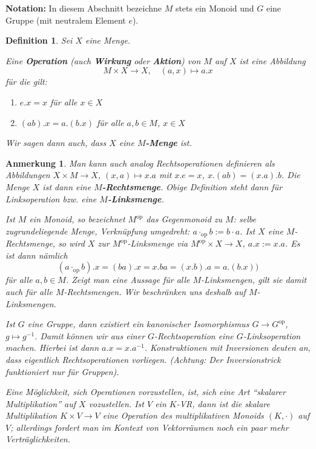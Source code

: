 \documentclass[a4paper, twoside, 11pt, ngerman]{report}
\theoremstyle{definistyle}
\newtheorem{defini}[satz]{Definition}
\newtheorem{anm}[satz]{Anmerkung}
\theoremstyle{remark}
\newcommand{\defn}[1]{\textit{\bfseries #1}}
\begin{document}
\textbf{Notation:} In diesem Abschnitt bezeichne $M$ stets ein Monoid und $G$ eine Gruppe (mit neutralem Element $e$).

\begin{defini}\label{def:operation}
Sei $X$ eine Menge.

Eine \defn{Operation} (auch \defn{Wirkung} oder \defn{Aktion}) von $M$ auf $X$ ist eine Abbildung
\[
M \times X \to X, \quad (a, x) \mapsto a . x
\]
für die gilt:
\begin{enumerate}[label=(O\arabic*)]
    \item $e . x = x$ für alle $x \in X$
    \item $(a b) . x = a . (b . x)$ für alle $a, b \in M$, $x \in X$
\end{enumerate}

Wir sagen dann auch, dass $X$ eine \defn{$M$-Menge} ist.
\end{defini}

\begin{anm}\label{anm:rechtsoperation}
Man kann auch analog \glqq Rechtsoperationen\grqq{} definieren als Abbildungen $X \times M \to X$, $(x, a) \mapsto x . a$ mit $x . e = x$, $x . (a  b) = (x . a) . b $. Die Menge $X$ ist dann eine \defn{$M$-Rechtsmenge}.
Obige Definition steht dann für \glqq Linksoperation\grqq{} bzw. eine \defn{$M$-Linksmenge}.

Ist $M$ ein Monoid, so bezeichnet $M^{\text{op}}$ das Gegenmonoid zu $M$: selbe zugrundeliegende Menge, Verknüpfung umgedreht: $a\cdot_{\text{op}} b:=b\cdot a$.
Ist $X$ eine $M$-Rechtsmenge, so wird $X$ zur $M^{\text{op}}$-Linksmenge via $M^{\text{op}} \times X \to X$, $a . x := x . a$. Es ist dann nämlich
\[
(a\cdot_{\text{op}} b) . x = (b a) . x = x . b a = (x . b) . a = a . (b . x))
\]
für alle $a,b\in M$. Zeigt man eine Aussage für alle $M$-Linksmengen, gilt sie damit auch für alle $M$-Rechtsmengen. Wir beschränken uns deshalb auf $M$-Linksmengen.

Ist $G$ eine Gruppe, dann existiert ein kanonischer Isomorphismus $G \to G^{\text{op}}$, $g \mapsto g^{-1}$. 
Damit können wir aus einer $G$-Rechtsoperation eine $G$-Linksoperation machen. Hierbei ist dann $a.x = x.a^{-1}$.
Konstruktionen mit Inversionen deuten an, dass eigentlich Rechtsoperationen vorliegen. (Achtung: Der Inversionstrick funktioniert nur für Gruppen).

Eine Möglichkeit, sich Operationen vorzustellen, ist, sich eine Art "`skalarer Multiplikation"' auf $X$ 
vozustellen. Ist $V$ ein $K$-VR, dann ist die skalare Multiplikation $K \times V \to V$ eine Operation des multiplikativen Monoids $(K, \cdot)$ auf $V$; allerdings fordert man im Kontext von Vektorräumen noch ein paar mehr Verträglichkeiten.

\end{anm}
\end{document}
